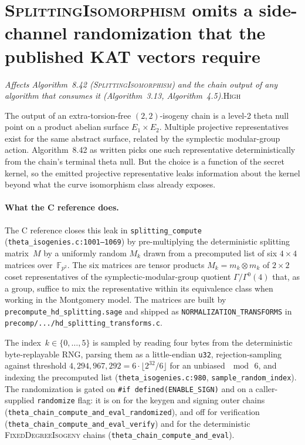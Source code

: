 \documentclass[a4paper,11pt]{article}
\newcommand{\algo}[1]{Algorithm~#1}
\newcommand{\Fpii}{\mathbb{F}_{p^2}}
\newcommand{\high}{\textsc{\color{BurntOrange}High}}
\newcommand{\finding}[2]{\noindent\textit{#1}\hfill#2\par\smallskip}
\begin{document}
\section{\textsc{SplittingIsomorphism} omits a side-channel
randomization that the published KAT vectors require}
\label{sec:specrev-splitter-randomization}

\finding{Affects \algo{8.42} (\textsc{SplittingIsomorphism}) and
  the chain output of any algorithm that consumes it (\algo{3.13},
  \algo{4.5}).}{\high}

The output of an extra-torsion-free $(2, 2)$-isogeny chain is a
level-2 theta null point on a product abelian surface
$E_1 \times E_2$.  Multiple projective representatives exist for
the same abstract surface, related by the symplectic
modular-group action.  \algo{8.42} as written picks one such
representative deterministically from the chain's terminal theta
null.  But the choice is a function of the secret kernel, so the
emitted projective representative leaks information about the
kernel beyond what the curve isomorphism class already exposes.

\paragraph{What the C reference does.}
The C reference closes this leak in
\texttt{splitting\_compute} (\texttt{theta\_isogenies.c:1001--1069})
by pre-multiplying the deterministic splitting matrix~$M$ by a
uniformly random $M_k$ drawn from a precomputed list of six
$4 \times 4$ matrices over~$\Fpii$.  The six matrices are tensor
products $M_k = m_k \otimes m_k$ of $2 \times 2$ coset
representatives of the symplectic-modular-group quotient
$\Gamma / \Gamma^0(4)$ that, as a group, suffice to mix the
representative within its equivalence class when working in the
Montgomery model.  The matrices are built by
\texttt{precompute\_hd\_splitting.sage} and shipped as
\texttt{NORMALIZATION\_TRANSFORMS} in
\texttt{precomp/.../hd\_splitting\_transforms.c}.

The index~$k \in \{0, \dots, 5\}$ is sampled by reading four bytes
from the deterministic byte-replayable RNG, parsing them as a
little-endian \texttt{u32}, rejection-sampling against threshold
$4{,}294{,}967{,}292 = 6 \cdot \lfloor 2^{32} / 6 \rfloor$ for an
unbiased~$\bmod\,6$, and indexing the precomputed list
(\texttt{theta\_isogenies.c:980}, \texttt{sample\_random\_index}).
The randomization is gated on \texttt{\#if defined(ENABLE\_SIGN)}
and on a caller-supplied \texttt{randomize} flag: it is on for the
keygen and signing outer chains
(\texttt{theta\_chain\_compute\_and\_eval\_randomized}), and off
for verification (\texttt{theta\_chain\_compute\_and\_eval\_verify})
and for the deterministic \textsc{FixedDegreeIsogeny} chains
(\texttt{theta\_chain\_compute\_and\_eval}).
\end{document}
